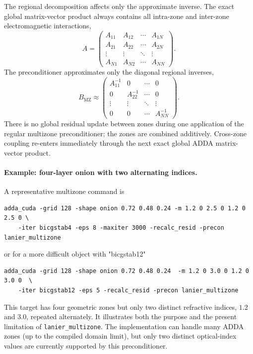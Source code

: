 \documentclass[11pt,a4paper]{article}
\begin{document}
The regional decomposition affects only the approximate inverse. The exact global matrix-vector product always contains all intra-zone and inter-zone electromagnetic interactions,
\begin{equation}
A=
\begin{pmatrix}
A_{11} & A_{12} & \cdots & A_{1N}\\
A_{21} & A_{22} & \cdots & A_{2N}\\
\vdots & \vdots & \ddots & \vdots\\
A_{N1} & A_{N2} & \cdots & A_{NN}
\end{pmatrix}.
\end{equation}
The preconditioner approximates only the diagonal regional inverses,
\begin{equation}
B_{\mathrm{MZ}}\approx
\begin{pmatrix}
A_{11}^{-1} & 0 & \cdots & 0\\
0 & A_{22}^{-1} & \cdots & 0\\
\vdots & \vdots & \ddots & \vdots\\
0 & 0 & \cdots & A_{NN}^{-1}
\end{pmatrix}.
\end{equation}
There is no global residual update between zones during one application of the regular multizone preconditioner; the zones are combined additively. Cross-zone coupling re-enters immediately through the next exact global ADDA matrix-vector product.


\paragraph{Example: four-layer onion with two alternating indices.}
A representative multizone command is
\begin{verbatim}
adda_cuda -grid 128 -shape onion 0.72 0.48 0.24 -m 1.2 0 2.5 0 1.2 0 2.5 0 \
	-iter bicgstab4 -eps 8 -maxiter 3000 -recalc_resid -precon lanier_multizone
\end{verbatim}
or for a more difficult object with "bicgstab12"
\begin{verbatim}
adda_cuda -grid 128 -shape onion 0.72 0.48 0.24  -m 1.2 0 3.0 0 1.2 0 3.0 0  \
	-iter bicgstab12 -eps 5 -recalc_resid -precon lanier_multizone
\end{verbatim}
This target has four geometric zones but only two distinct refractive indices, \(1.2\) and \(3.0\), repeated alternately. It illustrates both the purpose and the present limitation of \texttt{lanier\_multizone}. The implementation can handle many ADDA zones (up to the compiled domain limit), but only two distinct optical-index values are currently supported by this preconditioner.
\end{document}
